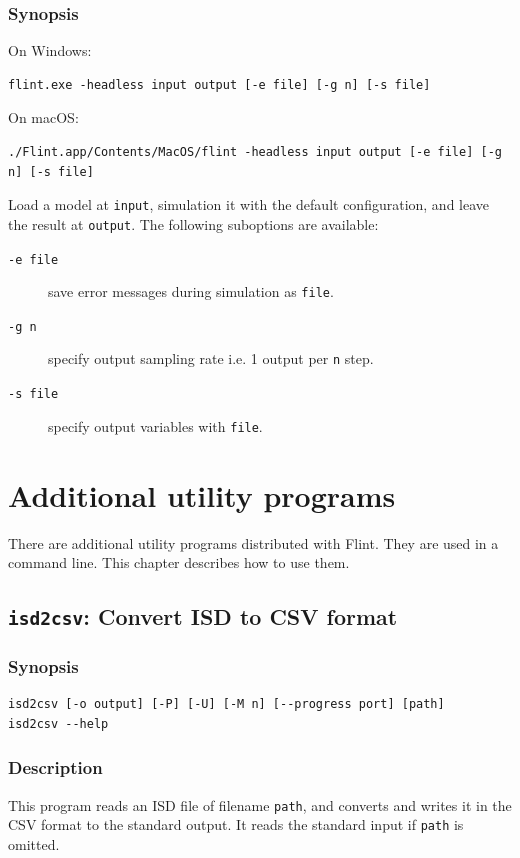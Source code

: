 \documentclass[a4paper,10pt]{report}
\begin{document}
\subsection{Synopsis}
\label{sec:orgc3bbc89}
On Windows:
\begin{verbatim}
flint.exe -headless input output [-e file] [-g n] [-s file]
\end{verbatim}
On macOS:
\begin{verbatim}
./Flint.app/Contents/MacOS/flint -headless input output [-e file] [-g n] [-s file]
\end{verbatim}
Load a model at \texttt{input}, simulation it with the default configuration,
and leave the result at \texttt{output}.
The following suboptions are available:

\begin{description}
\item[{\texttt{-e file}}] save error messages during simulation as \texttt{file}.
\item[{\texttt{-g n}}] specify output sampling rate i.e. 1 output per \texttt{n} step.
\item[{\texttt{-s file}}] specify output variables with \texttt{file}.
\end{description}

\chapter{Additional utility programs}
\label{sec:org221625c}
There are additional utility programs distributed with Flint.
They are used in a command line.
This chapter describes how to use them.

\section{\texttt{isd2csv}: Convert ISD to CSV format}
\label{sec:org85e6111}

\subsection{Synopsis}
\label{sec:org0642518}
\begin{verbatim}
isd2csv [-o output] [-P] [-U] [-M n] [--progress port] [path]
isd2csv --help
\end{verbatim}

\subsection{Description}
\label{sec:orgdece200}
This program reads an ISD file of filename \texttt{path}, and converts and writes
it in the CSV format to the standard output.
It reads the standard input if \texttt{path} is omitted.
\end{document}
